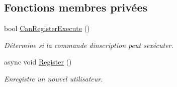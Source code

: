 \subsection*{Fonctions membres privées}
\begin{DoxyCompactItemize}
\item 
bool \hyperlink{class_boxes_1_1_view_models_1_1_register_view_model_a8eb66857f9959a2136094567aa44e548}{Can\+Register\+Execute} ()
\begin{DoxyCompactList}\small\item\em Détermine si la commande d\textquotesingle{}inscription peut s\textquotesingle{}exécuter. \end{DoxyCompactList}\item 
async void \hyperlink{class_boxes_1_1_view_models_1_1_register_view_model_add19d4be0a438b916e9b6109f03b5f6f}{Register} ()
\begin{DoxyCompactList}\small\item\em Enregistre un nouvel utilisateur. \end{DoxyCompactList}\end{DoxyCompactItemize}
